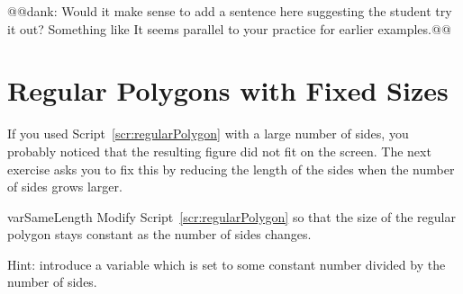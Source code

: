 @@dank: Would it make sense to add a sentence here suggesting the student try it out?  Something like \newcommand{\add}[1]{Try running Script~\ref{scr:regularPolygon} and changing the value of \ct{sides}.}  It seems parallel to your practice for earlier examples.@@

\section{Regular Polygons with Fixed Sizes}

If you \newcommand{\remove}[1]{have} used Script~\ref{scr:regularPolygon} with a large number of sides, you \newcommand{\replace}[2]{will have}{probably} noticed that the resulting figure did not fit on the screen.  The next exercise asks you to fix this by reducing the
length of the sides when the number of sides \newcommand{\replace}[2]{augments}{grows larger}.

\begin{exofig}{varSameLength} \label{exo:fixedSizePolygon}
Modify Script~\ref{scr:regularPolygon} so that the size of the
regular polygon stays constant as the number of sides changes.

Hint: introduce a variable \newcommand{\replace}[2]{length}{} which is set to \newcommand{\replace}[2]{a fixed length}{some constant number}
divided by the number of sides.
\end{exofig}


\summa

